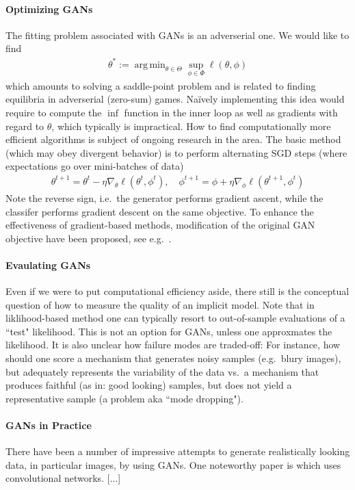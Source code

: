 \documentclass{article}
\DeclareMathOperator*{\argmin}{arg\,min}
\begin{document}
\paragraph{Optimizing GANs} The fitting problem associated with GANs is an adverserial one. We would like to find 
\begin{align}
\theta^* :=  \argmin_{\theta \in \Theta} \sup_{\phi \in \Phi} \ell(\theta,\phi)
\end{align}
which amounts to solving a saddle-point problem and is related to finding equilibria in adverserial (zero-sum) games. Na\"ively implementing this idea would require to compute the $\inf$ function in the inner loop as well as gradients with regard to $\theta$, which typically is impractical. How to find computationally more efficient algorithms is subject of ongoing research in the area. The basic method (which may obey  divergent behavior) is to perform alternating SGD steps (where expectations go over mini-batches of data)
\begin{align}
\theta^{t+1} = \theta^t - \eta \nabla_\theta \ell(\theta^t,\phi^t), \quad \phi^{t+1} = \phi + \eta \nabla_\phi \ell(\theta^{t+1},\phi^t)
\end{align}
Note the reverse sign, i.e.~the generator performs gradient ascent, while the classifer performs gradient descent on the same objective. To enhance the effectiveness of gradient-based methods, modification of the original GAN objective have been proposed, see e.g.~\cite{goodfellow2014generative,metz2016unrolled,roth2017stabilizing,mescheder2017numerics}.


\paragraph{Evaulating GANs} Even if we were to put computational efficiency aside, there still is the conceptual question of how to measure the quality of an implicit model. Note that in liklihood-based method one can typically resort to out-of-sample evaluations of a ``test" likelihood. This is not an option for GANs, unless one approxmates the likelihood. It is also unclear how failure modes are traded-off: For instance, how should one score a mechanism that generates noisy samples (e.g.~blury images), but adequately represents the variability of the data vs.~a mechanism that produces faithful (as in: good looking) samples, but does not yield a representative sample (a problem aka ``mode dropping"). 

\paragraph{GANs in Practice}

There have been a number of impressive attempts to generate realistically looking data, in particular images, by using GANs.  One noteworthy paper  is \cite{radford2015unsupervised} which uses convolutional networks. [...]



\end{document}
